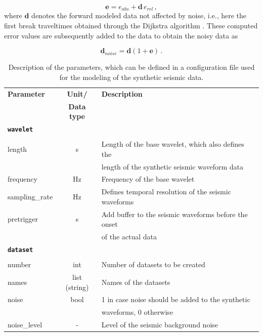 \documentclass[a4paper,fleqn]{cas-sc}
\newcommand{\vecmat}[1]{\bm #1}
\begin{document}
\begin{equation}
	\vecmat{e} = e_{abs} + \vecmat{d}\,e_{rel}\,, 
	\label{eq:esterr}
\end{equation}
where $\vecmat{d}$ denotes the forward modeled data not affected by noise, i.e., here the first break traveltimes obtained through the Dijkstra algorithm \citep{dijkstra1959}. These computed error values are subsequently added to the data to obtain the noisy data as

\begin{equation}
	\vecmat{d_{noise}}=\vecmat{d}\left(1 + \vecmat{e}\right)\,.
	\label{eq:noisydata}
\end{equation}

\begin{table}[]
    \caption{Description of the parameters, which can be defined in a configuration file used for the modeling of the synthetic seismic data.}
    \centering
    \begin{tabular*}{\tblwidth}{@{} LCL@{}}
        \toprule
        \textbf{Parameter} & \textbf{Unit/} & \textbf{Description} \\
         & \textbf{Data type} & \\ 
        \midrule
        \textbf{\texttt{wavelet}} & & \\
         & & \\
        length & s & Length of the base wavelet, which also defines the \\
         & & length of the synthetic seismic waveform data \\ 
        frequency & Hz & Frequency of the base wavelet \\ 
        sampling\_rate & Hz & Defines temporal resolution of the seismic waveforms \\ 
        pretrigger & s & Add buffer to the seismic waveforms before the onset \\
         & & of the actual data \\
        \midrule
        \textbf{\texttt{dataset}} & & \\
         & & \\
        number & int & Number of datasets to be created \\
        names & list (string) & Names of the datasets \\
        noise & bool & 1 in case noise should be added to the synthetic \\
         & & waveforms, 0 otherwise \\
        noise\_level & - & Level of the seismic background noise \\

\end{tabular*}
\end{table}
\end{document}
